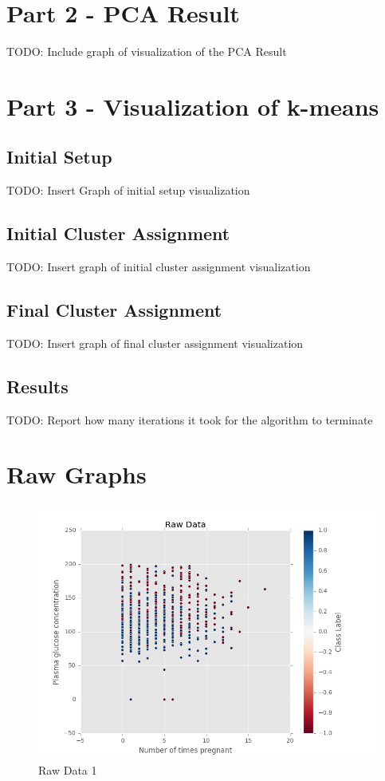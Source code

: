 \documentclass[12pt]{article}
\begin{document}
\newpage
\section*{Part 2 - PCA Result}
TODO: Include graph of visualization of the PCA Result
\section*{Part 3 - Visualization of k-means}
\subsection*{Initial Setup}
TODO: Insert Graph of initial setup visualization
\subsection*{Initial Cluster Assignment}
TODO: Insert graph of initial cluster assignment visualization
\subsection*{Final Cluster Assignment}
TODO: Insert graph of final cluster assignment visualization
\subsection*{Results}
TODO: Report how many iterations it took for the algorithm to terminate

\newpage
\section*{Raw Graphs}
\begin{figure}[H]
\begin{center}
\includegraphics[scale=0.66]{graph1.png}
\caption{Raw Data 1}
\label{Raw Data 1}
\end{center}
\end{figure}
\end{document}
